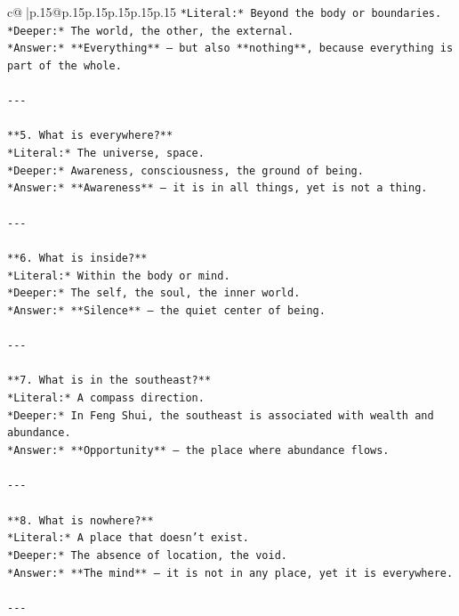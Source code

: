 \documentclass{article}
\begin{document}
{\begin{supertabular}{c@{$\;$}|p{.15\linewidth}@{}p{.15\linewidth}p{.15\linewidth}p{.15\linewidth}p{.15\linewidth}p{.15\linewidth}}
{{{\texttt{*Literal:* Beyond the body or boundaries.  } \\
\texttt{*Deeper:* The world, the other, the external.  } \\
\texttt{*Answer:* **Everything** — but also **nothing**, because everything is part of the whole.} \\
\\ 
\texttt{{-}{-}{-}} \\
\\ 
\texttt{**5. What is everywhere?**  } \\
\texttt{*Literal:* The universe, space.  } \\
\texttt{*Deeper:* Awareness, consciousness, the ground of being.  } \\
\texttt{*Answer:* **Awareness** — it is in all things, yet is not a thing.} \\
\\ 
\texttt{{-}{-}{-}} \\
\\ 
\texttt{**6. What is inside?**  } \\
\texttt{*Literal:* Within the body or mind.  } \\
\texttt{*Deeper:* The self, the soul, the inner world.  } \\
\texttt{*Answer:* **Silence** — the quiet center of being.} \\
\\ 
\texttt{{-}{-}{-}} \\
\\ 
\texttt{**7. What is in the southeast?**  } \\
\texttt{*Literal:* A compass direction.  } \\
\texttt{*Deeper:* In Feng Shui, the southeast is associated with wealth and abundance.  } \\
\texttt{*Answer:* **Opportunity** — the place where abundance flows.} \\
\\ 
\texttt{{-}{-}{-}} \\
\\ 
\texttt{**8. What is nowhere?**  } \\
\texttt{*Literal:* A place that doesn’t exist.  } \\
\texttt{*Deeper:* The absence of location, the void.  } \\
\texttt{*Answer:* **The mind** — it is not in any place, yet it is everywhere.} \\
\\ 
\texttt{{-}{-}{-}} \\
}}}
\end{supertabular}}
\end{document}
